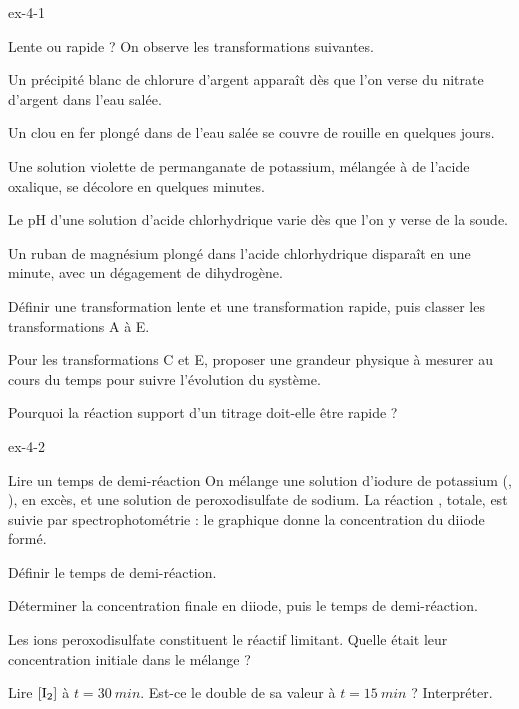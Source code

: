 \begin{blocLivre}{ex-4-1}
\begin{exercice}[1]{Lente ou rapide ?}
On observe les transformations suivantes.
\begin{questions}[label=\otLabel{\Alph*.},leftmargin=1.9em,itemsep=0pt,parsep=0.15em]
\item Un précipité blanc de chlorure d'argent apparaît dès que l'on verse du nitrate d'argent dans l'eau salée.
\item Un clou en fer plongé dans de l'eau salée se couvre de rouille en quelques jours.
\item Une solution violette de permanganate de potassium, mélangée à de l'acide oxalique, se décolore en quelques minutes.
\item Le pH d'une solution d'acide chlorhydrique varie dès que l'on y verse de la soude.
\item Un ruban de magnésium plongé dans l'acide chlorhydrique disparaît en une minute, avec un dégagement de dihydrogène.
\end{questions}
\begin{questions}
\item Définir une transformation lente et une transformation rapide, puis classer les transformations A à E.
\item Pour les transformations C et E, proposer une grandeur physique à mesurer au cours du temps pour suivre
l'évolution du système.
\item Pourquoi la réaction support d'un titrage doit-elle être rapide ?
\end{questions}
\end{exercice}
\end{blocLivre}
\begin{blocLivre}{ex-4-2}
\begin{exercice}[1]{Lire un temps de demi-réaction}
On mélange une solution d'iodure de potassium (, ), en excès, et une solution de peroxodisulfate de
sodium. La réaction , totale, est suivie par spectrophotométrie : le graphique
donne la concentration du diiode formé.
\begin{questions}
\item Définir le temps de demi-réaction.
\item Déterminer la concentration finale en diiode, puis le temps de demi-réaction.
\item Les ions peroxodisulfate constituent le réactif limitant. Quelle était leur concentration initiale dans le mélange ?
\item Lire $[\ce{I2}]$ à $t=\qty{30}{min}$. Est-ce le double de sa valeur à $t=\qty{15}{min}$ ? Interpréter.
\end{questions}
\end{exercice}
\end{blocLivre}
